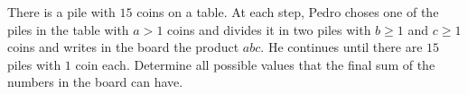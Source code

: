 There is a pile with $15$ coins on a table. At each step, Pedro choses one of the piles in the table with $a>1$ coins and divides it in two piles with $b\geq1$ and $c\geq1$ coins and writes in the board the product $abc$. He continues until there are $15$ piles with $1$ coin each. Determine all possible values that the final sum of the numbers in the board can have.